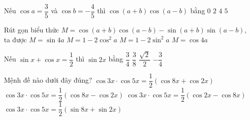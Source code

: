 \begin{ex}%
	Nếu $\cos a=\dfrac{3}{5}$ và $\cos b=-\dfrac{4}{5}$ thì $\cos (a+b) \cos (a-b)$ bằng
	\choice
	{\True $0$}
	{$2$}
	{$4$}
	{$5$}
\end{ex}




\begin{ex}%
	Rút gọn biểu thức $M=\cos(a+b)\cos(a-b)-\sin (a+b)\sin(a-b)$, ta được
	\choice
	{$M=\sin 4a$}
	{$M=1-2\cos^2a$}
	{\True $M=1-2\sin^2a$}
	{$M=\cos 4a$}
\end{ex}
\begin{ex}%
	Nếu $\sin x +\cos x = \dfrac{1}{2}$ thì $\sin 2x$ bằng
	\choice
	{$\dfrac{3}{4}$}
	{$\dfrac{3}{8}$}
	{$\dfrac{\sqrt{2}}{2}$}
	{\True $-\dfrac{3}{4}$}
\end{ex}
\begin{ex}%
	Mệnh đề nào dưới đây đúng?
	\choice
	{\True $\cos3x\cdot\cos5x=\dfrac{1}{2}(\cos8x+\cos2x)$}
	{$\cos3x\cdot\cos5x=\dfrac{1}{2}(\cos8x-\cos2x)$}
	{$\cos3x\cdot\cos5x=\dfrac{1}{2}(\cos2x-\cos8x)$}
	{$\cos3x\cdot\cos5x=\dfrac{1}{2}(\sin8x+\sin2x)$}
\end{ex}
